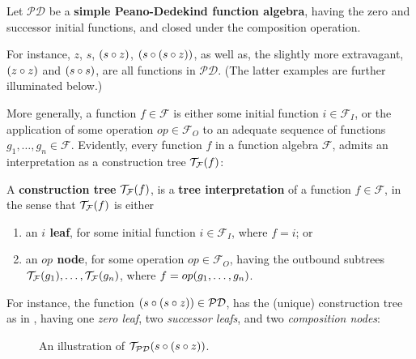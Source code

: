 \begin{definition} \label{def:function-algebra-p} Let $\mathcal{PD}$ be a
\textbf{simple Peano-Dedekind function algebra}, having the zero and successor
initial functions, and closed under the composition operation.\end{definition}

For instance, $z$, $s$, ${\mathopen{}\left({s \circ z}\right)\mathclose{}}$, ${\mathopen{}\left({s \circ {\ensuremath{\mathopen{}\left({s \circ z}\right)\mathclose{}}}}\right)\mathclose{}}$, as well
as, the slightly more extravagant, ${\mathopen{}\left({z \circ z}\right)\mathclose{}}$ and ${\mathopen{}\left({s \circ s}\right)\mathclose{}}$, are all
functions in $\mathcal{PD}$. (The latter examples are further illuminated
below.)

More generally, a function $f \in \mathcal{F}$ is either some initial function
$i \in \mathcal{F}_I$, or the application of some operation $op \in
\mathcal{F}_O$ to an adequate sequence of functions $g_1, \ldots, g_n \in
\mathcal{F}$.  Evidently, every function $f$ in a function algebra
$\mathcal{F}$, admits an interpretation as a construction tree
$\mathcal{T}_\mathcal{F}{\mathopen{}\left({f}\right)\mathclose{}}$:

\begin{definition} \label{def:construction-tree} A \textbf{construction tree}
$\mathcal{T}_\mathcal{F}{\mathopen{}\left({f}\right)\mathclose{}}$, is a \textbf{tree interpretation} of a function
$f \in \mathcal{F}$, in the sense that $\mathcal{T}_\mathcal{F}{\mathopen{}\left({f}\right)\mathclose{}}$ is either

\begin{enumerate}[label=(\arabic*)]

\item an \textbf{$i$ leaf}, for some initial function $i \in \mathcal{F}_I$, where $f =
i$; or

\item an \textbf{$op$ node}, for some operation $op \in \mathcal{F}_O$, having
the outbound subtrees $\mathcal{T}_\mathcal{F}{\mathopen{}\left({g_1}\right)\mathclose{}}, \ldots,
\mathcal{T}_\mathcal{F}{\mathopen{}\left({g_n}\right)\mathclose{}}$, where $f = op{\mathopen{}\left({g_1, \ldots, g_n}\right)\mathclose{}}$.

\end{enumerate}

\end{definition}

For instance, the function ${\mathopen{}\left({s \circ {\ensuremath{\mathopen{}\left({s \circ z}\right)\mathclose{}}}}\right)\mathclose{}} \in \mathcal{PD}$, has
the (unique) construction tree as in , having one \emph{zero
leaf}, two \emph{successor leafs}, and two \emph{composition nodes}:

\begin{figure}[h!]
\centering
{}
\caption[]{An illustration of $\mathcal{T}_\mathcal{PD}{\mathopen{}\left({s \circ {\ensuremath{\mathopen{}\left({s \circ z}\right)\mathclose{}}}}\right)\mathclose{}}$.}
\label{fig:s-s-z}
\end{figure}

